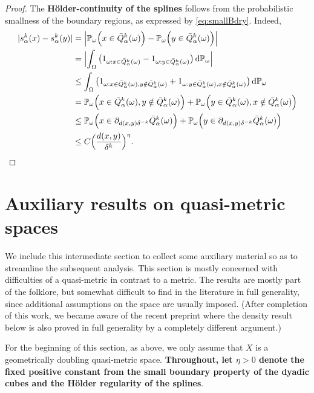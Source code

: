 \documentclass{amsart}
\numberwithin{equation}{section}
\theoremstyle{plain}
\theoremstyle{definition}
\theoremstyle{remark}
\begin{document}
{{\begin{proof}
The \textbf{H\"older-continuity of the splines} follows from the probabilistic smallness of the boundary regions, as expressed by \eqref{eq:smallBdry}. Indeed,
\begin{equation*}
\begin{split}
  {|{s^k_{\alpha}(x)-s^k_{\alpha}(y)}|}
  &={\Big|{{\mathbb{P}}_{\omega}\Big(x\in\bar{Q}^k_{\alpha}(\omega)\Big)-{\mathbb{P}}_{\omega}\Big(y\in\bar{Q}^k_{\alpha}(\omega)\Big)}\Big|} \\
  &={\Big|{\int_{\Omega}\big(1_{\omega:x\in \bar{Q}^k_{\alpha}(\omega)}-1_{\omega:y\in \bar{Q}^k_{\alpha}(\omega)}\big){\,\mathrm{d}}{\mathbb{P}}_{\omega}}\Big|} \\
  &\leq \int_{\Omega}\big(1_{\omega:x\in \bar{Q}^k_{\alpha}(\omega),y\notin\bar{Q}^k_{\alpha}(\omega) }
     +1_{\omega:y\in \bar{Q}^k_{\alpha}(\omega),x\notin\bar{Q}^k_{\alpha}(\omega) }\big){\,\mathrm{d}}{\mathbb{P}}_{\omega} \\
  &= {\mathbb{P}}_{\omega}\Big(x\in \bar{Q}^k_{\alpha}(\omega),y\notin\bar{Q}^k_{\alpha}(\omega)\Big)
     +{\mathbb{P}}_{\omega}\Big(y\in \bar{Q}^k_{\alpha}(\omega),x\notin\bar{Q}^k_{\alpha}(\omega) \Big) \\
  &\leq {\mathbb{P}}_{\omega}\Big(x\in \partial_{d(x,y)\delta^{-k}}\bar{Q}^k_{\alpha}(\omega)\Big)
     +{\mathbb{P}}_{\omega}\Big(y\in \partial_{d(x,y)\delta^{-k}}\bar{Q}^k_{\alpha}(\omega)\Big) \\
    &\leq C\Big(\frac{d(x,y)}{\delta^k}\Big)^{\eta}.\qedhere
\end{split}
\end{equation*}
\end{proof}

{
\section{Auxiliary results on quasi-metric spaces}
}

We include this intermediate section to collect some auxiliary material so as to streamline the subsequent analysis. This section is mostly concerned with difficulties of a quasi-metric in contrast to a metric. The results are mostly part of the folklore, but somewhat difficult to find in the literature in full generality, since additional assumptions on the space are usually imposed. { (After completion of this work, we became aware of  the recent preprint \cite{MMMM} where the density result below is also proved in full generality by a completely different argument.)}

For the beginning of this section, as above, we only assume that $X$ is a geometrically doubling quasi-metric space. \textbf{Throughout, let $\eta>0$ denote the fixed positive constant from the small boundary property of the dyadic cubes and the H\"older regularity of the splines}.

}}
\end{document}
